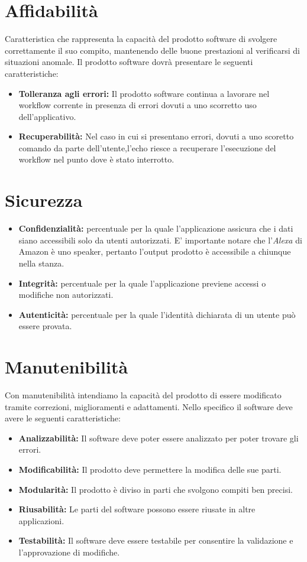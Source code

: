 \section{Affidabilità}
Caratteristica che rappresenta la capacità del prodotto software di svolgere correttamente il suo compito, mantenendo delle buone prestazioni al verificarsi di situazioni anomale. 
Il prodotto software dovrà presentare le seguenti caratteristiche:
\begin{itemize}
	\item \textbf{Tolleranza agli errori:} Il prodotto software continua a lavorare nel workflow corrente in presenza di errori dovuti a uno scorretto uso dell'applicativo.
	\item \textbf{Recuperabilità:} Nel caso in cui si presentano errori, dovuti a uno scoretto comando da parte dell'utente,l'echo riesce a recuperare l'esecuzione  del workflow nel punto dove è stato interrotto.
\end{itemize}
\section{Sicurezza}
\begin{itemize}
	\item \textbf{Confidenzialità:} percentuale per la quale l'applicazione assicura che i dati siano accessibili solo da utenti autorizzati. E' importante notare che l'\textit{Alexa} di Amazon è uno speaker, pertanto l'output prodotto è accessibile a chiunque nella stanza.
	\item \textbf{Integrità:} percentuale per la quale l'applicazione previene accessi o modifiche non autorizzati.
	\item \textbf{Autenticità:} percentuale per la quale l'identità dichiarata di un utente può essere provata.
\end{itemize}
\section{Manutenibilità}
Con manutenibilità intendiamo la capacità del prodotto di essere modificato tramite correzioni, miglioramenti e adattamenti.
Nello specifico il software deve avere le seguenti caratteristiche:
\begin{itemize}
	\item \textbf{Analizzabilità:} Il software deve poter essere analizzato per poter trovare gli errori.
	\item \textbf{Modificabilità:} Il prodotto deve permettere la modifica delle sue parti.
	\item \textbf{Modularità:} Il prodotto è diviso in parti che svolgono compiti ben precisi.
	\item \textbf{Riusabilità:} Le parti del software possono essere riusate in altre applicazioni.
	\item \textbf{Testabilità:} Il software deve essere testabile per consentire la validazione e l'approvazione di modifiche.
\end{itemize}	
	
